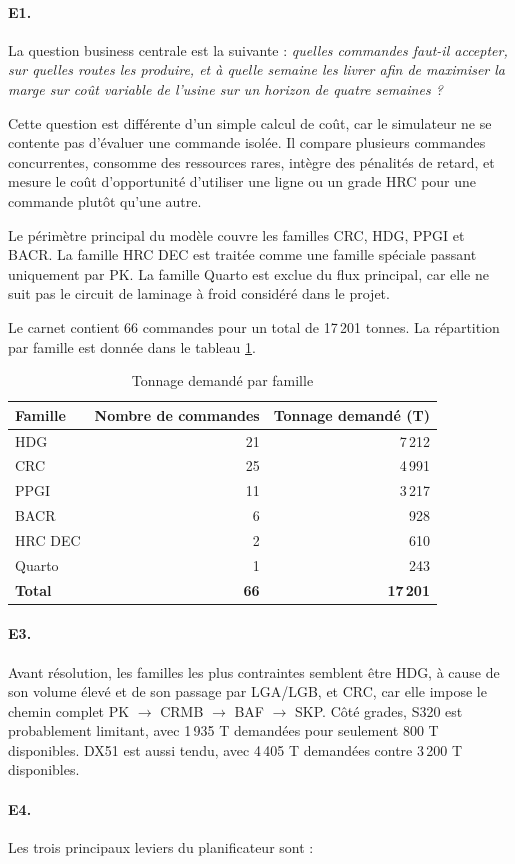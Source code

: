 \documentclass[12pt,a4paper]{article}
\newcommand{\question}[1]{\paragraph{\textcolor{blue!50!black}{#1.}}}
\begin{document}
\question{E1}
La question business centrale est la suivante : \textit{quelles commandes faut-il accepter, sur quelles routes les produire, et à quelle semaine les livrer afin de maximiser la marge sur coût variable de l'usine sur un horizon de quatre semaines ?}

Cette question est différente d'un simple calcul de coût, car le simulateur ne se contente pas d'évaluer une commande isolée. Il compare plusieurs commandes concurrentes, consomme des ressources rares, intègre des pénalités de retard, et mesure le coût d'opportunité d'utiliser une ligne ou un grade HRC pour une commande plutôt qu'une autre.

Le périmètre principal du modèle couvre les familles CRC, HDG, PPGI et BACR. La famille HRC DEC est traitée comme une famille spéciale passant uniquement par PK. La famille Quarto est exclue du flux principal, car elle ne suit pas le circuit de laminage à froid considéré dans le projet.

Le carnet contient 66 commandes pour un total de 17\,201 tonnes. La répartition par famille est donnée dans le tableau \ref{tab:tonnage-famille}.

\begin{table}[H]
\centering
\caption{Tonnage demandé par famille}
\label{tab:tonnage-famille}
\begin{tabular}{lrr}
\toprule
Famille & Nombre de commandes & Tonnage demandé (T) \\
\midrule
HDG & 21 & 7\,212 \\
CRC & 25 & 4\,991 \\
PPGI & 11 & 3\,217 \\
BACR & 6 & 928 \\
HRC DEC & 2 & 610 \\
Quarto & 1 & 243 \\
\midrule
\textbf{Total} & \textbf{66} & \textbf{17\,201} \\
\bottomrule
\end{tabular}
\end{table}

\question{E3}
Avant résolution, les familles les plus contraintes semblent être HDG, à cause de son volume élevé et de son passage par LGA/LGB, et CRC, car elle impose le chemin complet PK $\rightarrow$ CRMB $\rightarrow$ BAF $\rightarrow$ SKP. Côté grades, S320 est probablement limitant, avec 1\,935 T demandées pour seulement 800 T disponibles. DX51 est aussi tendu, avec 4\,405 T demandées contre 3\,200 T disponibles.

\question{E4}
Les trois principaux leviers du planificateur sont :
\end{document}
